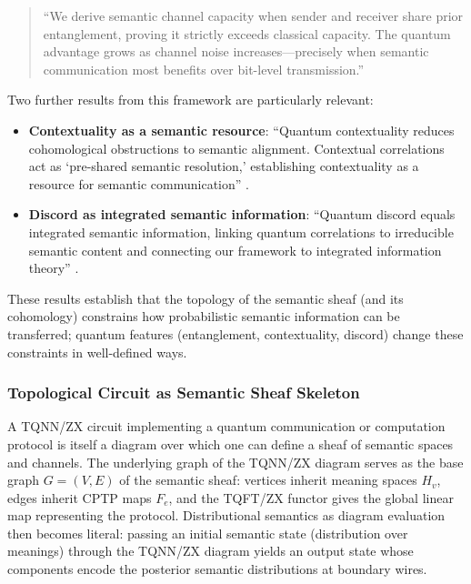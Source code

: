 \documentclass[
]{article}
\providecommand{\tightlist}{%
  \setlength{\itemsep}{0pt}\setlength{\parskip}{0pt}}
\numberwithin{equation}{section}
\begin{document}
\begin{quote}
``We derive semantic channel capacity when sender and receiver share
prior entanglement, proving it strictly exceeds classical capacity. The
quantum advantage grows as channel noise increases---precisely when
semantic communication most benefits over bit-level transmission.''
\citep{khatri2025quantum}
\end{quote}

Two further results from this framework are particularly relevant:

\begin{itemize}
\tightlist
\item
  \textbf{Contextuality as a semantic resource}: ``Quantum contextuality
  reduces cohomological obstructions to semantic alignment. Contextual
  correlations act as `pre-shared semantic resolution,' establishing
  contextuality as a resource for semantic communication''
  \citep{khatri2025quantum}.
\item
  \textbf{Discord as integrated semantic information}: ``Quantum discord
  equals integrated semantic information, linking quantum correlations
  to irreducible semantic content and connecting our framework to
  integrated information theory'' \citep{khatri2025quantum}.
\end{itemize}

These results establish that the topology of the semantic sheaf (and its
cohomology) constrains how probabilistic semantic information can be
transferred; quantum features (entanglement, contextuality, discord)
change these constraints in well-defined ways.

\subsubsection{Topological Circuit as Semantic Sheaf
Skeleton}\label{topological-circuit-as-semantic-sheaf-skeleton}

A TQNN/ZX circuit implementing a quantum communication or computation
protocol is itself a diagram over which one can define a sheaf of
semantic spaces and channels. The underlying graph of the TQNN/ZX
diagram serves as the base graph \(G=(V,E)\) of the semantic sheaf:
vertices inherit meaning spaces \(H_v\), edges inherit CPTP maps
\(F_e\), and the TQFT/ZX functor gives the global linear map
representing the protocol. Distributional semantics as diagram
evaluation then becomes literal: passing an initial semantic state
(distribution over meanings) through the TQNN/ZX diagram yields an
output state whose components encode the posterior semantic
distributions at boundary wires.
\end{document}
